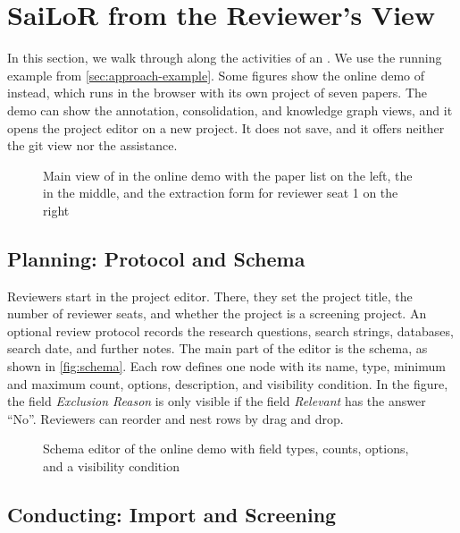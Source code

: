 \section{SaiLoR from the Reviewer's View}\label{sec:tool}

In this section, we walk through \SaiLoR along the activities of an \SLR.
We use the running example from \autoref{sec:approach-example}.
Some figures show the online demo of \SaiLoR instead, which runs in the browser with its own project of seven papers.
The demo can show the annotation, consolidation, and knowledge graph views, and it opens the project editor on a new project.
It does not save, and it offers neither the git view nor the \LLM assistance.

\begin{figure}[t]
    \centering
    \caption{Main view of \SaiLoR in the online demo with the paper list on the left, the \PDF in the middle, and the extraction form for reviewer seat 1 on the right}
    \label{fig:annotate}
\end{figure}

\subsection{Planning: Protocol and Schema}\label{sec:tool-planning}

Reviewers start in the project editor.
There, they set the project title, the number of reviewer seats, and whether the project is a screening project.
An optional review protocol records the research questions, search strings, databases, search date, and further notes.
The main part of the editor is the schema, as shown in \autoref{fig:schema}.
Each row defines one node with its name, type, minimum and maximum count, options, description, and visibility condition.
In the figure, the field \emph{Exclusion Reason} is only visible if the field \emph{Relevant} has the answer \enquote{No}.
Reviewers can reorder and nest rows by drag and drop.

\begin{figure}[t]
    \centering
    \caption{Schema editor of the online demo with field types, counts, options, and a visibility condition}
    \label{fig:schema}
\end{figure}

\subsection{Conducting: Import and Screening}\label{sec:tool-screening}

